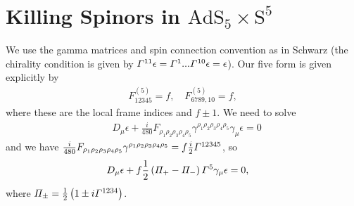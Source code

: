 \documentclass[11pt]{article}
\let\oldGamma=\Gamma
\let\oldPi=\Pi
\renewcommand{\Gamma}{\mathnormal{\oldGamma}}
\renewcommand{\Pi}{\mathnormal{\oldPi}}
\newcommand{\Sphere}{\mathrm{S}}  %
\newcommand{\AdS}{\mathrm{AdS}}
\begin{document}
\section{Killing Spinors in $\AdS_5 \times \Sphere^5$}
We use the gamma matrices and spin connection convention as in Schwarz (the chirality condition is given by $\Gamma^{11} \epsilon = \Gamma^1 ...\Gamma^{10}\epsilon = \epsilon$).
Our five form is given explicitly by
\begin{align}
F^{(5)}_{12345} = f,\quad
F^{(5)}_{6789,10} = f,
\end{align}
where these are the local frame indices and $f\pm 1$.
We need to solve
\begin{align}
& D_\mu \epsilon + \frac{i}{480} F_{\rho_1 \rho_2 \rho_3 \rho_4 \rho_5}\gamma^{\rho_1 \rho_2 \rho_3 \rho_4 \rho_5} \gamma_\mu \epsilon = 0
\end{align}
and we have $\frac{i}{480} F_{\rho_1 \rho_2 \rho_3 \rho_4 \rho_5}\gamma^{\rho_1 \rho_2 \rho_3 \rho_4 \rho_5}  = f\frac{i}{2} \Gamma^{12345}$, so
\begin{align}
& D_\mu \epsilon + f\frac{1}{2}\left(\Pi_+ - \Pi_-\right)\Gamma^5\gamma_\mu \epsilon = 0,
\end{align}
where $\Pi_\pm = \frac{1}{2}\left(1 \pm i\Gamma^{1234}\right)$.
\end{document}
